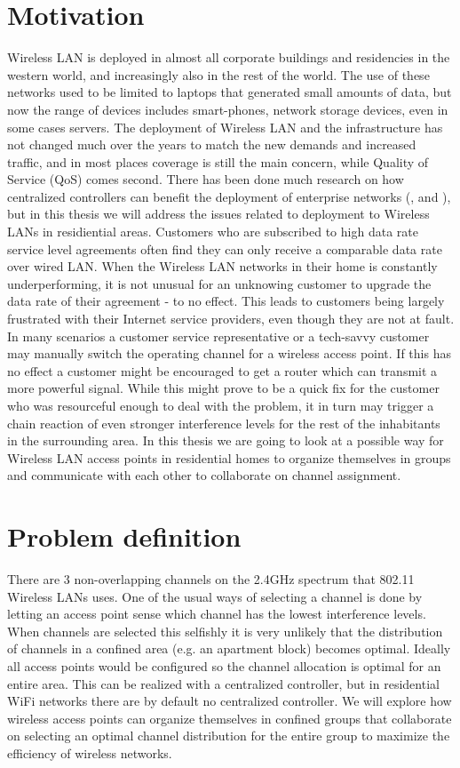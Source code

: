 \section{Motivation}
Wireless LAN is deployed in almost all corporate buildings and residencies in the western world, and increasingly also in the rest of the world.
The use of these networks used to be limited to laptops that generated small amounts of data, but now the range of devices includes
smart-phones, network storage devices, even in some cases servers. The deployment of Wireless LAN and the infrastructure has not 
changed much over the years to match the new demands and increased traffic, and in most places coverage is still the main concern, while
Quality of Service (QoS) comes second. There has been done much research on how centralized controllers can benefit the deployment
of enterprise networks (\cite{Murty}, \cite{Murty2} and \cite{Suresh}),
but in this thesis we will address the issues related to deployment to Wireless LANs in residiential areas. Customers who are subscribed
to high data rate service level agreements often find they can only receive a comparable data rate over wired LAN. When the
Wireless LAN networks in their home is constantly underperforming, it is not unusual for an unknowing customer to upgrade the
data rate of their agreement - to no effect. This leads to customers being largely frustrated with their Internet service providers,
even though they are not at fault. In many scenarios a customer service representative or a tech-savvy customer may manually
switch the operating channel for a wireless access point. If this has no effect a customer might be encouraged to get a router
which can transmit a more powerful signal. While this might prove to be a quick fix for the customer who was resourceful enough to deal with the problem,
it in turn may trigger a chain reaction of even stronger interference levels for the rest of the inhabitants in the surrounding area.
In this thesis we are going to look at a possible way for Wireless LAN access points in residential homes to organize themselves
in groups and communicate with each other to collaborate on channel assignment.

\section{Problem definition}
There are 3 non-overlapping channels on the 2.4GHz spectrum that 802.11 Wireless LANs uses. One of the usual ways of selecting a channel
is done by letting an access point sense which channel has the lowest interference levels. When channels are selected this
selfishly it is very unlikely that the distribution of channels in a confined area (e.g. an apartment block) becomes optimal.  
Ideally all access points would be configured so the channel allocation is optimal for an entire area.
This can be realized with a centralized controller, but in residential WiFi networks there are by default no centralized controller.
We will explore how wireless access points can organize themselves in confined groups that collaborate on selecting an optimal channel
distribution for the entire group to maximize the efficiency of wireless networks.

